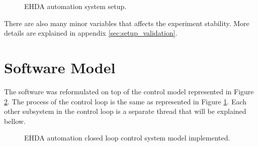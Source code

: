 \begin{figure}[H]
  \centering
  \caption{EHDA automation system setup.}
  \label{fig:setup}
\end{figure}

There are also many minor variables that affects the experiment stability. More details are explained in appendix \ref{sec:setup_validation}.


\section{Software Model}
\label{sec:control_model}

The software was reformulated on top of the control model represented in Figure \ref{fig:control_model_fig}. The process of the control loop is the same as represented in Figure \ref{fig:setup}. 
Each other subsystem in the control loop is a separate thread that will be explained bellow.

\begin{figure}[H]
  \centering
  \caption{EHDA automation closed loop control system model implemented.}
  \label{fig:control_model_fig}
\end{figure}

